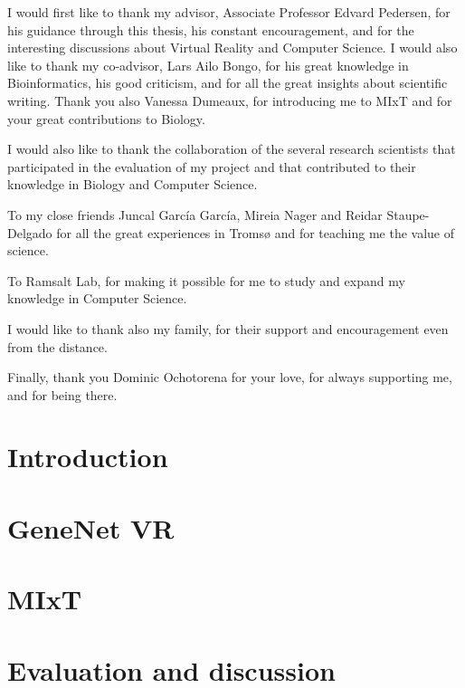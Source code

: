 \documentclass[USenglish]{uit-thesis}
\begin{document}
\begin{acknowledgement}

I would first like to thank my advisor, Associate Professor Edvard Pedersen, for his guidance through this thesis, his constant encouragement, and for the interesting discussions about Virtual Reality and Computer Science. I would also like to thank my co-advisor, Lars Ailo Bongo, for his great knowledge in Bioinformatics, his good criticism, and for all the great insights about scientific writing. Thank you also Vanessa Dumeaux, for introducing me to MIxT and for your great contributions to Biology.

I would also like to thank the collaboration of the several research scientists that participated in the evaluation of my project and that contributed to their knowledge in Biology and Computer Science.

To my close friends Juncal García García, Mireia Nager and Reidar Staupe-Delgado for all the great experiences in Tromsø and for teaching me the value of science.

To Ramsalt Lab, for making it possible for me to study and expand my knowledge in Computer Science.

I would like to thank also my family, for their support and encouragement even from the distance.

Finally, thank you Dominic Ochotorena for your love, for always supporting me, and for being there.

\end{acknowledgement}

\tableofcontents

\mainmatter

\chapter{Introduction}


\chapter{GeneNet VR}


\chapter{MIxT}


\chapter{Evaluation and discussion}

\end{document}
